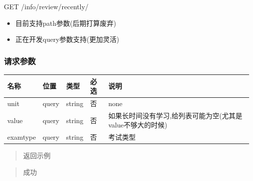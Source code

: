 \documentclass[
]{article}
\begin{document}
GET /info/review/recently/

\begin{itemize}
\item
  目前支持path参数(后期打算废弃)
\item
  正在开发query参数支持(更加灵活)
\end{itemize}

\hypertarget{ux8bf7ux6c42ux53c2ux6570-43}{%
\subsubsection{请求参数}\label{ux8bf7ux6c42ux53c2ux6570-43}}

\begin{longtable}[]{@{}lllll@{}}
\toprule
名称 & 位置 & 类型 & 必选 & 说明 \\
\midrule
\endhead
unit & query & string & 否 & none \\
value & query & string & 否 &
如果长时间没有学习,给列表可能为空(尤其是value不够大的时候) \\
examtype & query & string & 否 & 考试类型 \\
\bottomrule
\end{longtable}

\begin{quote}
返回示例
\end{quote}

\begin{quote}
成功
\end{quote}
\end{document}
